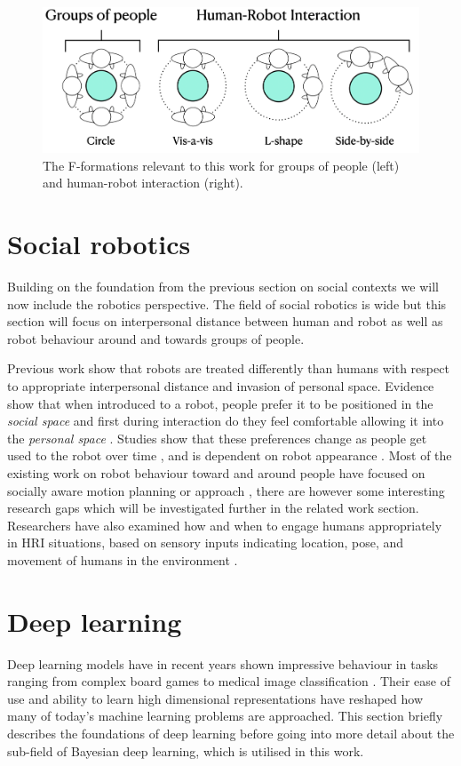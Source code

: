 \documentclass[a4paper,12pt]{report}
\begin{document}
\begin{figure}[h]
\centering
\includegraphics[width=13cm]{figs/formation.png}
\caption{The F-formations relevant to this work for groups of people (left) and human-robot interaction (right).}
\label{formation}
\end{figure}



\section{Social robotics}
Building on the foundation from the previous section on social contexts we will now include the robotics perspective. The field of social robotics is wide but this section will focus on interpersonal distance between human and robot as well as robot behaviour around and towards groups of people. 

Previous work show that robots are treated differently than humans with respect to appropriate interpersonal distance and invasion of personal space. Evidence show that when introduced to a robot, people prefer it to be positioned in the \textit{social space} and first during interaction do they feel comfortable allowing it into the \textit{personal space} \cite{huttenrauch2006investigating, walters2009empirical}. Studies show that these preferences change as people get used to the robot over time \cite{koay2007living}, and is dependent on robot appearance \cite{walters2008avoiding}. Most of the existing work on robot behaviour toward and around people have focused on socially aware motion planning \cite{triebel2016spencer} or approach \cite{walters2007robotic}, there are however some interesting research gaps which will be investigated further in the related work section. Researchers have also examined how and when to engage humans appropriately in HRI situations, based on sensory inputs indicating location, pose, and movement of humans in the environment \cite{michalowski2006spatial}.


\section{Deep learning}
Deep learning models have in recent years shown impressive behaviour in tasks ranging from complex board games \cite{go} to medical image classification \cite{derma}. Their ease of use and ability to learn high dimensional representations have reshaped how many of today's machine learning problems are approached.
This section briefly describes the foundations of deep learning before going into more detail about the sub-field of Bayesian deep learning, which is utilised in this work.
\end{document}
